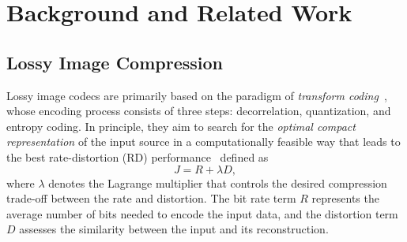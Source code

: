 \section{Background and Related Work}
\label{section_related_work}


    \subsection{Lossy Image Compression}\label{subsec:lossy-image-compression}

    Lossy image codecs are primarily based on the paradigm of \emph{transform coding}~\cite{trans_coding}, whose encoding process consists of three steps: decorrelation, quantization, and entropy coding.
    In principle, they aim to search for the \emph{optimal compact representation} of the input source in a computationally feasible way that leads to the best rate-distortion (RD) performance~\cite{rd_theory} defined as
    \begin{equation}
    \label{RDO}
    J = R + \lambda D,
    \end{equation}
    where $\lambda$ denotes the Lagrange multiplier that controls the desired compression trade-off between the rate and distortion. The bit rate term $R$ represents the average number of bits needed to encode the input data, and the distortion term $D$ assesses the similarity between the input and its reconstruction.

